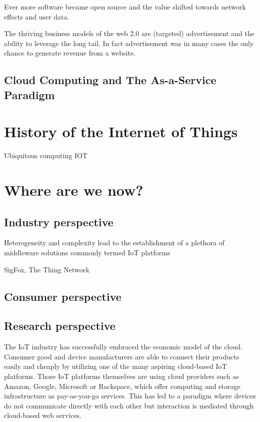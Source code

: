 Ever more software became open source and the value shifted towards network effects and user data.

The thriving business models of the web 2.0 are (targeted) advertisement and the ability to leverage the long tail. In fact advertisement was in many cases the only chance to generate revenue from a website.  



\subsection{Cloud Computing and The As-a-Service Paradigm}

\section{History of the Internet of Things}
Ubiquitous computing
IOT 

\section{Where are we now?}


\subsection{Industry perspective}

Heterogeneity and complexity lead to the establishment of a plethora of middleware solutions commonly termed IoT platforms

SigFox, The Thing Network

\subsection{Consumer perspective}

\subsection{Research perspective}

The IoT industry has successfully embraced the economic model of the cloud. Consumer good and device manufacturers are able to connect their products easily and cheaply by utilizing one of the many aspiring cloud-based IoT platforms. Those IoT platforms themselves are using cloud providers such as Amazon, Google, Microsoft or Rackspace, which offer computing and storage infrastructure as pay-as-you-go services. This has led to a paradigm where devices do not communicate directly with each other but interaction is mediated through cloud-based web services.

